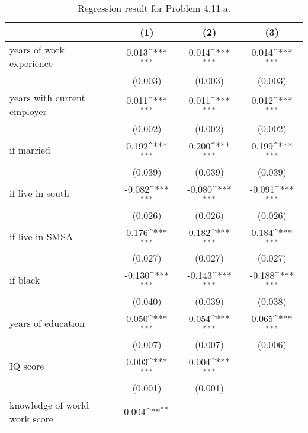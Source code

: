 \begin{table}[htbp]\centering
\def\sym#1{\ifmmode^{#1}\else\(^{#1}\)\fi}
\caption{Regression result for Problem 4.11.a.}
\begin{tabular}{l*{3}{c}}
\toprule
                    &\multicolumn{1}{c}{(1)}         &\multicolumn{1}{c}{(2)}         &\multicolumn{1}{c}{(3)}         \\
\midrule
years of work experience&       0.013\sym{***}&       0.014\sym{***}&       0.014\sym{***}\\
                    &     (0.003)         &     (0.003)         &     (0.003)         \\
\addlinespace
years with current employer&       0.011\sym{***}&       0.011\sym{***}&       0.012\sym{***}\\
                    &     (0.002)         &     (0.002)         &     (0.002)         \\
\addlinespace
=1 if married       &       0.192\sym{***}&       0.200\sym{***}&       0.199\sym{***}\\
                    &     (0.039)         &     (0.039)         &     (0.039)         \\
\addlinespace
=1 if live in south &      -0.082\sym{***}&      -0.080\sym{***}&      -0.091\sym{***}\\
                    &     (0.026)         &     (0.026)         &     (0.026)         \\
\addlinespace
=1 if live in SMSA  &       0.176\sym{***}&       0.182\sym{***}&       0.184\sym{***}\\
                    &     (0.027)         &     (0.027)         &     (0.027)         \\
\addlinespace
=1 if black         &      -0.130\sym{***}&      -0.143\sym{***}&      -0.188\sym{***}\\
                    &     (0.040)         &     (0.039)         &     (0.038)         \\
\addlinespace
years of education  &       0.050\sym{***}&       0.054\sym{***}&       0.065\sym{***}\\
                    &     (0.007)         &     (0.007)         &     (0.006)         \\
\addlinespace
IQ score            &       0.003\sym{***}&       0.004\sym{***}&                     \\
                    &     (0.001)         &     (0.001)         &                     \\
\addlinespace
knowledge of world work score&       0.004\sym{**} &                     &                     \\

\end{tabular}
\end{table}
